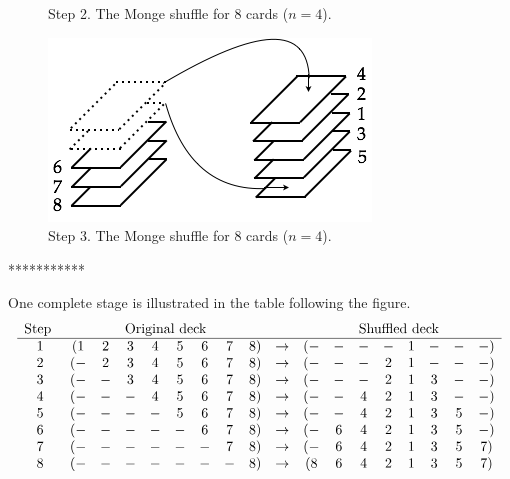 \begin{enumerate}
\begin{enumerate}
{\begin{figure}[h]
\begin{center}
        \caption{Step 2. The Monge shuffle for $8$ cards ($n=4$).}
        \label{fig:suffleMonge2}
\end{center}
\end{figure}
\begin{figure}[h]
\begin{center}
        \includegraphics[scale=0.4]{FiguresArithmetic/suffleMongeStep3}
        \caption{Step 3. The Monge shuffle for $8$ cards ($n=4$).}
        \label{fig:suffleMonge3}
\end{center}
\end{figure}
***********}
One complete stage is illustrated in the table following the figure.
\[ \begin{array}{cccccccccccccccccc}
\mbox{Step } & \multicolumn{8}{c}{\mbox{Original deck}} & &
     \multicolumn{8}{c}{\mbox{Shuffled deck}} \\
\hline
1 & (1 & 2 & 3 & 4 & 5 & 6 & 7 & 8) & \rightarrow & ( - & - & - & - & 1 & - &  - & - ) \\
2 & ( - & 2 & 3 & 4 & 5 & 6 & 7 & 8) & \rightarrow & ( - & - & - & 2 & 1 & - & - & - ) \\
3 & ( - & - & 3 & 4 & 5 & 6 & 7 & 8) &  \rightarrow& ( - & - & - & 2 & 1 & 3 & - & - ) \\
4 & ( - & - & - & 4 & 5 & 6 & 7 & 8) &  \rightarrow& ( - & - & 4 & 2 & 1 & 3 & - & - ) \\
5 & ( - & - & - & - & 5 & 6 & 7 & 8) &  \rightarrow& ( - & - & 4 & 2 & 1 & 3 & 5 & - ) \\
6 & ( - & - & - & - & - & 6 & 7 & 8) &  \rightarrow& ( - & 6 & 4 & 2 & 1 & 3 & 5 & - ) \\
7 & ( - & - & - & - & - & - & 7 & 8) &  \rightarrow& ( - & 6 & 4 & 2 & 1 & 3 & 5 & 7 ) \\
8 & ( - & - & - & - & - & - & - & 8) &  \rightarrow& ( 8 & 6 & 4 & 2 & 1 & 3 & 5 & 7 ) \\
\end{array}
\]


\end{enumerate}
\end{enumerate}
